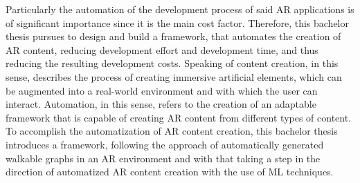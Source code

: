 \documentclass[12pt,a4paper,oneside,american,parskip=half]{article}
\begin{document}
\begin{justify}
\begin{normalsize}
Particularly the automation of the development process of said AR applications is of significant importance since it is the main cost factor.
Therefore, this bachelor thesis pursues to design and build a framework, that automates the creation of AR content, reducing development effort and development time, and thus reducing the resulting development costs.
\newline
Speaking of content creation, in this sense, describes the process of creating immersive artificial elements, which can be augmented into a real-world environment and with which the user can interact.
Automation, in this sense, refers to the creation of an adaptable framework that is capable of creating AR content from different types of content. 
To accomplish the automatization of AR content creation, this bachelor thesis introduces a framework, following the approach of automatically generated walkable graphs in an AR environment and with that taking a step in the direction of automatized AR content creation with the use of \ac{ML} techniques.


\end{normalsize}
\end{justify}
\end{document}
